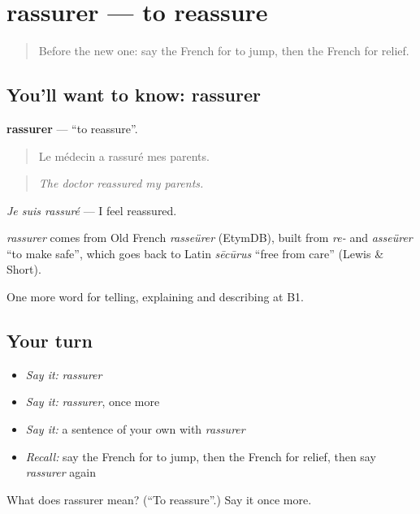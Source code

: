 \section[rassurer]{rassurer — to reassure}

\label{lesson:FR-C470-rassurer}



\begin{quote}
Before the new one: say the French for to jump, then the French for relief.
\end{quote}

\subsection*{You'll want to know: rassurer}
\textbf{rassurer} — \textquotedblleft{}to reassure\textquotedblright{}.

\begin{quote}
Le médecin a rassuré mes parents.
\end{quote}

\begin{quote}
\emph{The doctor reassured my parents.}
\end{quote}

\emph{Je suis rassuré} — I feel reassured.

\begin{cousinweb}
\emph{rassurer} comes from Old French \emph{rasseürer} (EtymDB), built from \emph{re-} and \emph{asseürer} \textquotedblleft{}to make safe\textquotedblright{}, which goes back to Latin \emph{sēcūrus} \textquotedblleft{}free from care\textquotedblright{} (Lewis \& Short).
\end{cousinweb}

\begin{grammarlens}[title={What you've built}]
One more word for telling, explaining and describing at B1.
\end{grammarlens}

\subsection*{Your turn}
\begin{itemize}
\raggedright
  \item \emph{Say it:} \emph{rassurer}
  \item \emph{Say it:} \emph{rassurer}, once more
  \item \emph{Say it:} a sentence of your own with \emph{rassurer}
  \item \emph{Recall:} say the French for to jump, then the French for relief, then say \emph{rassurer} again
\end{itemize}

\begin{tcolorbox}[breakable,colback=teal!4,colframe=teal!35!black,title={Before you move on}]
What does rassurer mean? (\textquotedblleft{}To reassure\textquotedblright{}.) Say it once more.
\end{tcolorbox}
